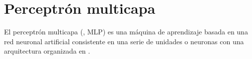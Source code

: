 %
%
%
\section{Perceptrón multicapa}
%




El perceptrón multicapa (, MLP)
\cite{mlp2,mlp1} es una máquina de aprendizaje basada en una red
neuronal artificial consistente en una serie de {unidades} o neuronas
con una arquitectura organizada en .




